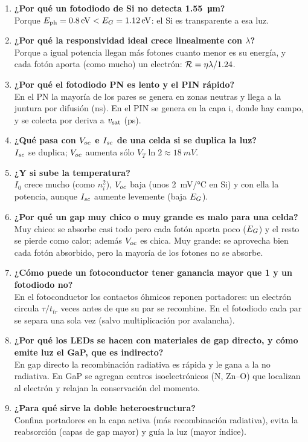 \begin{enumerate}
  \item \textbf{¿Por qué un fotodiodo de Si no detecta \SI{1.55}{\micro m}?}\\
  Porque $\Eph=\SI{0.8}{\eV}<\EG=\SI{1.12}{\eV}$: el Si es transparente a esa luz.
  \item \textbf{¿Por qué la responsividad ideal crece linealmente con $\lambda$?}\\
  Porque a igual potencia llegan más fotones cuanto menor es su energía, y cada fotón
  aporta (como mucho) un electrón: $\mathcal{R}=\eta\lambda/1.24$.
  \item \textbf{¿Por qué el fotodiodo PN es lento y el PIN rápido?}\\
  En el PN la mayoría de los pares se genera en zonas neutras y llega a la juntura por
  difusión (ns). En el PIN se genera en la capa i, donde hay campo, y se colecta por deriva
  a $v_{\mathrm{sat}}$ (ps).
  \item \textbf{¿Qué pasa con $V_{oc}$ e $I_{sc}$ de una celda si se duplica la luz?}\\
  $I_{sc}$ se duplica; $V_{oc}$ aumenta sólo $V_T\ln2\approx\SI{18}{mV}$.
  \item \textbf{¿Y si sube la temperatura?}\\
  $I_0$ crece mucho (como $n_i^2$), $V_{oc}$ baja (unos \SI{2}{mV/\celsius} en Si) y con ella la
  potencia, aunque $I_{sc}$ aumente levemente (baja $E_G$).
  \item \textbf{¿Por qué un gap muy chico o muy grande es malo para una celda?}\\
  Muy chico: se absorbe casi todo pero cada fotón aporta poco ($E_G$) y el resto se pierde
  como calor; además $V_{oc}$ es chica. Muy grande: se aprovecha bien cada fotón absorbido,
  pero la mayoría de los fotones no se absorbe.
  \item \textbf{¿Cómo puede un fotoconductor tener ganancia mayor que 1 y un fotodiodo no?}\\
  En el fotoconductor los contactos óhmicos reponen portadores: un electrón circula
  $\tau/t_{tr}$ veces antes de que su par se recombine. En el fotodiodo cada par se
  separa una sola vez (salvo multiplicación por avalancha).
  \item \textbf{¿Por qué los LEDs se hacen con materiales de gap directo, y cómo emite
  luz el GaP, que es indirecto?}\\
  En gap directo la recombinación radiativa es rápida y le gana a la no radiativa. En GaP
  se agregan centros isoelectrónicos (N, Zn--O) que localizan al electrón y relajan la
  conservación del momento.
  \item \textbf{¿Para qué sirve la doble heteroestructura?}\\
  Confina portadores en la capa activa (más recombinación radiativa), evita la
  reabsorción (capas de gap mayor) y guía la luz (mayor índice).
\end{enumerate}


